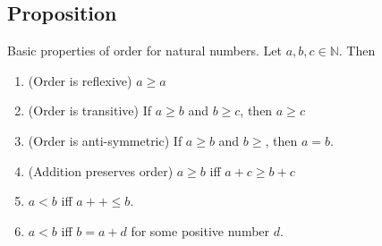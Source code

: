 \documentclass{report}
\begin{document}
\subsection{Proposition} Basic properties of order for natural numbers. Let $a,b,c \in \mathbb{N}$. Then
\begin{enumerate}
	\item (Order is reflexive) $a \geq a$
	\item (Order is transitive) If  $a \geq b$ and $b \geq c$, then $a \geq c$
	\item (Order is anti-symmetric) If  $a \geq b$ and $b \geq$, then $a =b$.
	\item (Addition preserves order)  $a \geq b$ iff $a+c \geq b+c$
	\item  $a < b$ iff $a++ \leq b$.
	\item  $a < b $ iff $b = a + d$ for some positive number $d$. 
\end{enumerate}
\end{document}
